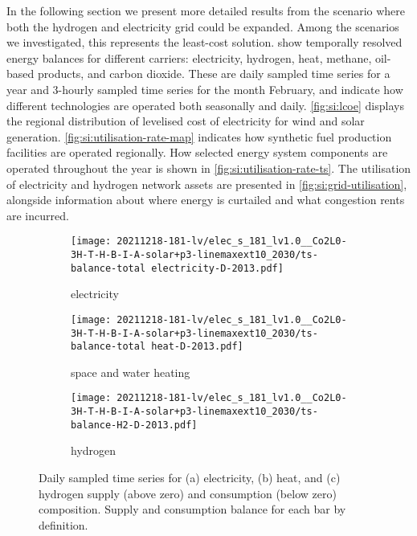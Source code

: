 In the following section we present more detailed results from the scenario
where both the hydrogen and electricity grid could be expanded. Among the
scenarios we investigated, this represents the least-cost solution.
 show temporally resolved energy
balances for different carriers: electricity, hydrogen, heat, methane, oil-based
products, and carbon dioxide. These are daily sampled time series for a year and
3-hourly sampled time series for the month February, and indicate how different
technologies are operated both seasonally and daily. \cref{fig:si:lcoe} displays
the regional distribution of levelised cost of electricity for wind and solar
generation. \cref{fig:si:utilisation-rate-map} indicates how synthetic fuel
production facilities are operated regionally. How selected energy system
components are operated throughout the year is shown in
\cref{fig:si:utilisation-rate-ts}. The utilisation of electricity and hydrogen
network assets are presented in \cref{fig:si:grid-utilisation}, alongside
information about where energy is curtailed and what congestion rents are
incurred.

\begin{figure}
    \centering
    \begin{subfigure}[t]{\textwidth}
        \centering
        \caption{electricity}
        \texttt{[image: 20211218-181-lv/elec\_s\_181\_lv1.0\_\_Co2L0-3H-T-H-B-I-A-solar+p3-linemaxext10\_2030/ts-balance-total electricity-D-2013.pdf]}
    \end{subfigure}
    \begin{subfigure}[t]{\textwidth}
        \centering
        \caption{space and water heating}
        \texttt{[image: 20211218-181-lv/elec\_s\_181\_lv1.0\_\_Co2L0-3H-T-H-B-I-A-solar+p3-linemaxext10\_2030/ts-balance-total heat-D-2013.pdf]}
    \end{subfigure}
    \begin{subfigure}[t]{\textwidth}
        \centering
        \caption{hydrogen}
        \texttt{[image: 20211218-181-lv/elec\_s\_181\_lv1.0\_\_Co2L0-3H-T-H-B-I-A-solar+p3-linemaxext10\_2030/ts-balance-H2-D-2013.pdf]}
    \end{subfigure}
    \caption{Daily sampled time series for (a) electricity, (b) heat, and (c) hydrogen supply (above zero) and consumption (below zero) composition. Supply and consumption balance for each bar by definition.}
    \label{fig:output-ts-1}
\end{figure}

